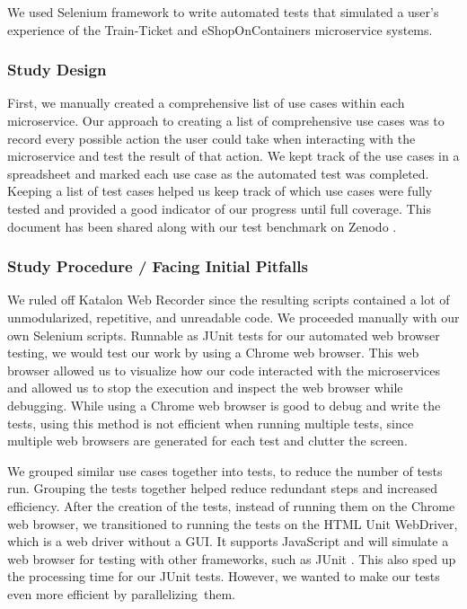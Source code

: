 We used Selenium framework to write automated tests that simulated a user’s experience of the Train-Ticket and eShopOnContainers microservice systems.


\subsubsection{Study Design}
First, we manually created a comprehensive list of use cases within each microservice. Our approach to creating a list of comprehensive use cases was to record every possible action the user could take when interacting with the microservice and test the result of that action. We kept track of the use cases in a spreadsheet and marked each use case as the automated test was completed. Keeping a list of test cases helped us keep track of which use cases were fully tested and provided a good indicator of our progress until full coverage. This document has been shared along with our test benchmark on Zenodo \cite{zenodo_benchmark}.

\subsubsection{Study Procedure / Facing Initial Pitfalls}
We ruled off Katalon Web Recorder \cite{katalon} since the resulting scripts contained a lot of unmodularized, repetitive, and unreadable code. We proceeded manually with our own Selenium scripts. Runnable as JUnit tests for our automated web browser testing, we would test our work by using a Chrome web browser. This web browser allowed us to visualize how our code interacted with the microservices and allowed us to stop the execution and inspect the web browser while debugging. While using a Chrome web browser is good to debug and write the tests, using this method is not efficient when running multiple tests, since multiple web browsers are generated for each test and clutter the screen.

We grouped similar use cases together into tests, to reduce the number of tests run. Grouping the tests together helped reduce redundant steps and increased efficiency. After the creation of the tests, instead of running them on the Chrome web browser, we transitioned to running the tests on the HTML Unit WebDriver, which is a web driver without a GUI. It supports JavaScript and will simulate a web browser for testing with other frameworks, such as JUnit \cite{html_unit}. This also sped up the processing time for our JUnit tests. However, we wanted to make our tests even more efficient by parallelizing~them.

